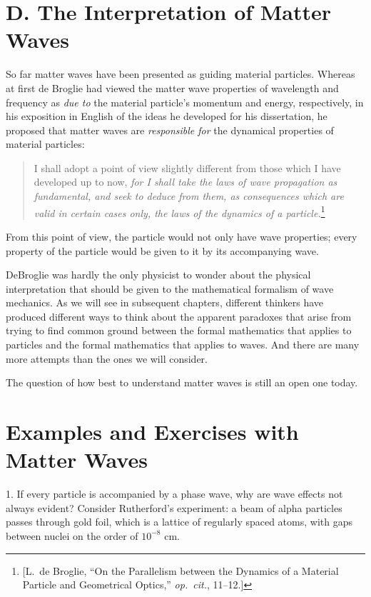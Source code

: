 \section*{D. The Interpretation of Matter Waves}

So far matter waves have been presented as guiding material particles.
Whereas at first de Broglie had viewed the matter wave properties of
wavelength and frequency as \emph{due to} the material particle's
momentum and energy, respectively, in his exposition in English of the
ideas he developed for his dissertation, he proposed that matter waves
are \emph{responsible for} the dynamical properties of material
particles:

\begin{quote}
I shall adopt a point of view slightly different from those which I have
developed up to now, \emph{for I shall take the laws of wave propagation
as fundamental, and seek to deduce from them, as consequences which are
valid in certain cases only, the laws of the dynamics of a
particle.}\footnote{{[}L.\ de Broglie, ``On the Parallelism between the
  Dynamics of a Material Particle and Geometrical Optics,'' \emph{op.\ 
  cit.}, 11--12.{]}}
\end{quote}

From this point of view, the particle would not only have wave
properties; every property of the particle would be given to it by its
accompanying wave.

DeBroglie was hardly the only physicist to wonder about the physical
interpretation that should be given to the mathematical formalism of
wave mechanics. As we will see in subsequent chapters, different
thinkers have produced different ways to think about the apparent
paradoxes that arise from trying to find common ground between the
formal mathematics that applies to particles and the formal mathematics
that applies to waves. And there are many more attempts than the ones we
will consider.

The question of how best to understand matter waves is still an open one
today.


\section*{Examples and Exercises with Matter Waves}

1. If every particle is accompanied by a phase wave, why are wave
effects not always evident? Consider Rutherford's experiment: a beam of
alpha particles passes through gold foil, which is a lattice of
regularly spaced atoms, with gaps between nuclei on the order of
$10^{-8}$ cm.


